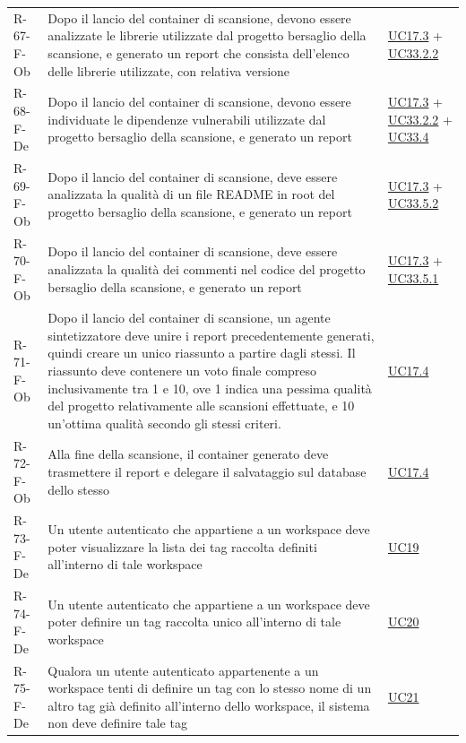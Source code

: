 \documentclass[a4paper, 11pt]{article}
\begin{document}
\begin{longtable}[c]{ >{\centering\arraybackslash}m{2.5cm} >{\centering\arraybackslash}m{8.3cm} >{\centering\arraybackslash}m{3.5cm} }
    R-67-F-Ob & Dopo il lancio del container di scansione, devono essere analizzate le librerie utilizzate dal progetto bersaglio della scansione, e generato un report che consista dell'elenco delle librerie utilizzate, con relativa versione & \hyperref[UC17.3]{UC17.3} + \hyperref[UC33.2.2]{UC33.2.2}\\
    R-68-F-De & Dopo il lancio del container di scansione, devono essere individuate le dipendenze vulnerabili utilizzate dal progetto bersaglio della scansione, e generato un report & \hyperref[UC17.3]{UC17.3} + \hyperref[UC33.2.2]{UC33.2.2} + \hyperref[UC33.4]{UC33.4}\\
    R-69-F-Ob & Dopo il lancio del container di scansione, deve essere analizzata la qualità di un file README in root del progetto bersaglio della scansione, e generato un report & \hyperref[UC17.3]{UC17.3} + \hyperref[UC33.5.2]{UC33.5.2}\\
    R-70-F-Ob & Dopo il lancio del container di scansione, deve essere analizzata la qualità dei commenti nel codice del progetto bersaglio della scansione, e generato un report & \hyperref[UC17.3]{UC17.3} + \hyperref[UC33.5.1]{UC33.5.1}\\
    R-71-F-Ob & Dopo il lancio del container di scansione, un agente sintetizzatore deve unire i report precedentemente generati, quindi creare un unico riassunto a partire dagli stessi. Il riassunto deve contenere un voto finale compreso inclusivamente tra 1 e 10, ove 1 indica una pessima qualità del progetto relativamente alle scansioni effettuate, e 10 un'ottima qualità secondo gli stessi criteri. & \hyperref[UC17.4]{UC17.4}\\
    R-72-F-Ob & Alla fine della scansione, il container generato deve trasmettere il report e delegare il salvataggio sul database dello stesso & \hyperref[UC17.4]{UC17.4}\\
    R-73-F-De & Un utente autenticato che appartiene a un workspace deve poter visualizzare la lista dei tag raccolta definiti all'interno di tale workspace & \hyperref[UC19]{UC19}\\
    R-74-F-De & Un utente autenticato che appartiene a un workspace deve poter definire un tag raccolta unico all'interno di tale workspace & \hyperref[UC20]{UC20}\\
    R-75-F-De & Qualora un utente autenticato appartenente a un workspace tenti di definire un tag con lo stesso nome di un altro tag già definito all'interno dello workspace, il sistema non deve definire tale tag & \hyperref[UC21]{UC21}\\

\end{longtable}
\end{document}
